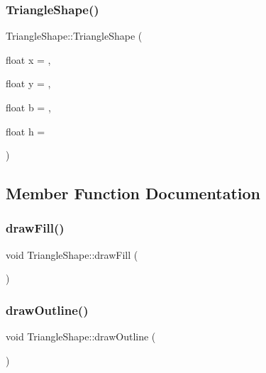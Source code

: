\subsubsection{\texorpdfstring{Triangle\+Shape()}{TriangleShape()}}
{\footnotesize\ttfamily Triangle\+Shape\+::\+Triangle\+Shape (\begin{DoxyParamCaption}\item[{float}]{x = {},  }\item[{float}]{y = {},  }\item[{float}]{b = {},  }\item[{float}]{h = {} }\end{DoxyParamCaption})}



\subsection{Member Function Documentation}
\hypertarget{class_triangle_shape_a1405e2b1b5d9c9e8283156eec6cbf021}{}\label{class_triangle_shape_a1405e2b1b5d9c9e8283156eec6cbf021} 
\subsubsection{\texorpdfstring{draw\+Fill()}{drawFill()}}
{\footnotesize\ttfamily void Triangle\+Shape\+::draw\+Fill (\begin{DoxyParamCaption}{ }\end{DoxyParamCaption})}

\hypertarget{class_triangle_shape_add481f7167360aeeaf411d714c9d68be}{}\label{class_triangle_shape_add481f7167360aeeaf411d714c9d68be} 
\subsubsection{\texorpdfstring{draw\+Outline()}{drawOutline()}}
{\footnotesize\ttfamily void Triangle\+Shape\+::draw\+Outline (\begin{DoxyParamCaption}{ }\end{DoxyParamCaption})}

\hypertarget{class_triangle_shape_aa0d2b84703d859f14c73023315bd3896}{}\label{class_triangle_shape_aa0d2b84703d859f14c73023315bd3896} 
